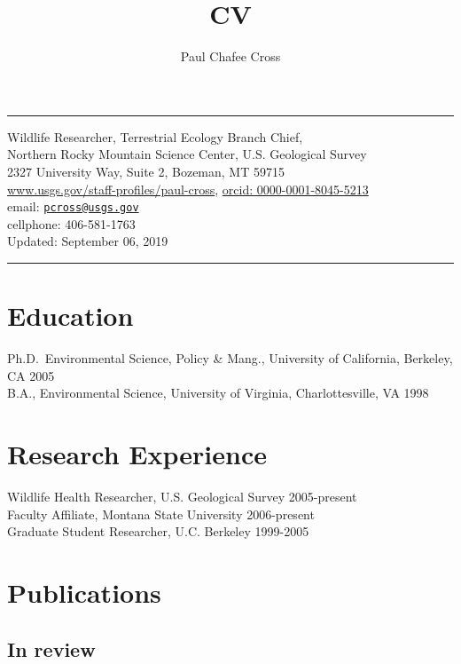 \documentclass[12pt,]{article}
\title{CV}
\author{Paul Chafee Cross}
\date{}
\begin{document}
\maketitle

\hrule
\centering

Wildlife Researcher, Terrestrial Ecology Branch Chief,\\
Northern Rocky Mountain Science Center, U.S. Geological Survey\\
2327 University Way, Suite 2, Bozeman, MT 59715\\
\href{http://www.usgs.gov/staff-profiles/paul-cross}{www.usgs.gov/staff-profiles/paul-cross},
\href{http://orcid.org/0000-0001-8045-5213}{orcid:
0000-0001-8045-5213}\\
email: \href{mailto:pcross@usgs.gov}{\nolinkurl{pcross@usgs.gov}}\\
cellphone: 406-581-1763\\
Updated: September 06, 2019

\hrule

\raggedright

\hypertarget{education}{%
\section{Education}\label{education}}

Ph.D.~Environmental Science, Policy \& Mang., University of California,
Berkeley, CA \hfill 2005\\
B.A., Environmental Science, University of Virginia, Charlottesville, VA
\hfill 1998

\hypertarget{research-experience}{%
\section{Research Experience}\label{research-experience}}

Wildlife Health Researcher, U.S. Geological Survey \hfill 2005-present\\
Faculty Affiliate, Montana State University \hfill 2006-present\\
Graduate Student Researcher, U.C. Berkeley \hfill 1999-2005

\hypertarget{publications}{%
\section{Publications}\label{publications}}

\hypertarget{in-review}{%
\subsection{In review}\label{in-review}}
\end{document}
